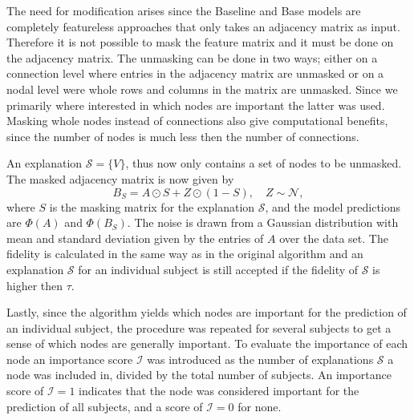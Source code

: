 The need for modification arises since the Baseline and Base models are completely featureless approaches that only takes an adjacency matrix as input. Therefore it is not possible to mask the feature matrix and it must be done on the adjacency matrix. The unmasking can be done in two ways; either on a connection level where entries in the adjacency matrix are unmasked or on a nodal level were whole rows and columns in the matrix are unmasked. Since we primarily where interested in which nodes are important the latter was used. Masking whole nodes instead of connections also give computational benefits, since the number of nodes is much less then the number of connections. 

An explanation $\mathcal{S} = \{V\}$, thus now only contains a set of nodes to be unmasked. The masked adjacency matrix is now given by 
\begin{equation*}
    B_S = A \odot S + Z \odot (1- S), \quad Z \sim \mathcal{N},
\end{equation*}
where $S$ is the masking matrix for the explanation $\mathcal{S}$, and the model predictions are $\Phi(A)$ and $\Phi(B_S)$. The noise is drawn from a Gaussian distribution with mean and standard deviation given by the entries of $A$ over the data set. The fidelity is calculated in the same way as in the original algorithm and an explanation $\mathcal{S}$ for an individual subject is still accepted if the fidelity of $\mathcal{S}$ is higher then $\tau$. 

Lastly, since the algorithm yields which nodes are important for the prediction of an individual subject, the procedure was repeated for several subjects to get a sense of which nodes are generally important. To evaluate the importance of each node an importance score $\mathcal{I}$ was introduced as the number of explanations $\mathcal{S}$ a node was included in, divided by the total number of subjects. An importance score of $\mathcal{I}=1$ indicates that the node was considered important for the prediction of all subjects, and a score of $\mathcal{I}=0$ for none.  



